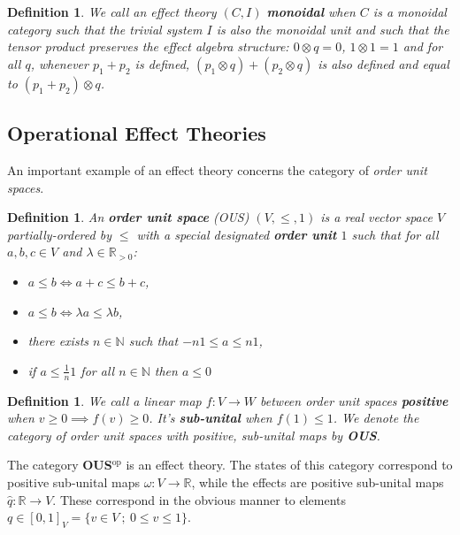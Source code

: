 \documentclass[a4paper,onecolumn,10pt,accepted=2019-05-03, issue=1, volume=1, shorttitle=papers/compositionality-1-1]{compositionalityarticle}
\newcounter{counter}
\numberwithin{counter}{section}
\newtheorem{definition}[counter]{Definition}
\newcommand{\R}{\mathbb{R}}
\newcommand{\N}{\mathbb{N}}
\newcommand{\opp}{\text{op}}
\begin{document}
\begin{definition}
    We call an effect theory $(C,I)$ \textbf{monoidal} when $C$ is a monoidal category such that the trivial system $I$ is also the monoidal unit and such that the tensor product preserves the effect algebra structure: $0\otimes q = 0$, $1\otimes 1 = 1$ and for all $q$, whenever $p_1+p_2$ is defined, $(p_1\otimes q)+(p_2\otimes q)$ is also defined and equal to $(p_1+p_2)\otimes q$.
\end{definition}

\subsection{Operational Effect Theories}

An important example of an effect theory concerns the category of \emph{order unit spaces}.

\begin{definition} \label{def:OUS}
    An \textbf{order unit space} (OUS) $(V,\leq,1)$ is a real vector space $V$ partially-ordered by $\leq$ with a special designated \textbf{order unit} $1$ such that for all $a,b,c\in V$ and $\lambda\in\R_{> 0}$:
    \begin{itemize}
        \item $a\leq b \iff a+c\leq b+c$,
        \item $a\leq b \iff \lambda a \leq \lambda b$,
        \item there exists $n\in \N$ such that $-n 1 \leq a \leq n 1$,
        \item if $a\leq \frac1n 1$ for all $n\in \N$ then $a\leq 0$
    \end{itemize}
\end{definition}

\begin{definition}
    We call a linear map $f:V\rightarrow W$ between order unit spaces \textbf{positive} when $v\geq 0\implies f(v)\geq 0$. It's \textbf{sub-unital} when $f(1)\leq 1$. We denote the category of order unit spaces with positive, sub-unital maps by \textbf{OUS}.
\end{definition}

The category \textbf{OUS}$^\opp$ is an effect theory. The states of this category correspond to positive sub-unital maps $\omega: V\rightarrow \R$, while the effects are positive sub-unital maps $\hat{q}:\R \rightarrow V$. These correspond in the obvious manner to elements $q\in [0,1]_V = \{v\in V~;~0\leq v \leq 1\}$.
\end{document}
